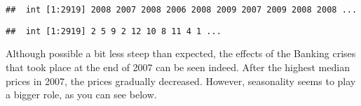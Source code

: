 \documentclass[]{article}
\newenvironment{Shaded}{\begin{snugshade}}{\end{snugshade}}
\newcommand{\KeywordTok}[1]{\textcolor[rgb]{0.13,0.29,0.53}{\textbf{#1}}}
\newcommand{\NormalTok}[1]{#1}
\newcommand{\OperatorTok}[1]{\textcolor[rgb]{0.81,0.36,0.00}{\textbf{#1}}}
\newcommand{\StringTok}[1]{\textcolor[rgb]{0.31,0.60,0.02}{#1}}
\begin{document}
\begin{Shaded}
\end{Shaded}

\begin{verbatim}
##  int [1:2919] 2008 2007 2008 2006 2008 2009 2007 2009 2008 2008 ...
\end{verbatim}

\begin{Shaded}
\end{Shaded}

\begin{verbatim}
##  int [1:2919] 2 5 9 2 12 10 8 11 4 1 ...
\end{verbatim}

\begin{Shaded}
\end{Shaded}

Although possible a bit less steep than expected, the effects of the
Banking crises that took place at the end of 2007 can be seen indeed.
After the highest median prices in 2007, the prices gradually decreased.
However, seasonality seems to play a bigger role, as you can see below.
\end{document}
